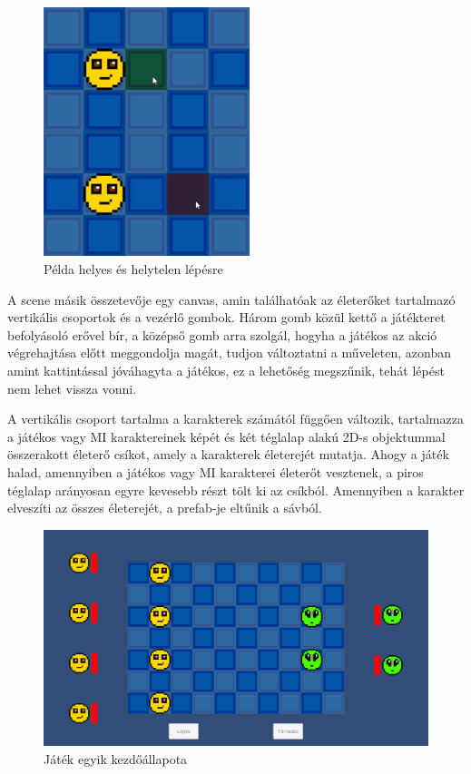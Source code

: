 \documentclass[
]{thesis-ekf}
\theoremstyle{definition}
\theoremstyle{remark}
\begin{document}
\begin{figure}[h!]
	\centering
	\includegraphics[width=6cm]{./pictures/game_move_tile.png}
	\caption{Példa helyes és helytelen lépésre}
	\label{gamemove}
\end{figure}

A scene másik összetevője egy canvas, amin találhatóak az életerőket tartalmazó vertikális csoportok és a vezérlő gombok. Három gomb közül kettő a játékteret befolyásoló erővel bír, a középső gomb arra szolgál, hogyha a játékos az akció végrehajtása előtt meggondolja magát, tudjon változtatni a műveleten, azonban amint kattintással jóváhagyta a játékos, ez a lehetőség megszűnik, tehát lépést nem lehet vissza vonni.

A vertikális csoport tartalma a karakterek számától függően változik, tartalmazza a játékos vagy MI karaktereinek képét és két téglalap alakú 2D-s objektummal összerakott életerő csíkot, amely a karakterek életerejét mutatja. Ahogy a játék halad, amennyiben a játékos vagy MI karakterei életerőt vesztenek, a piros téglalap arányosan egyre kevesebb részt tölt ki az csíkból. Amennyiben a karakter elveszíti az összes életerejét, a prefab-je eltűnik a sávból.

\begin{figure}[h!]
	\centering
	\includegraphics[width=14cm]{./pictures/game_health_ui.png}
	\caption{Játék egyik kezdőállapota}
	\label{game}
\end{figure}
\end{document}
